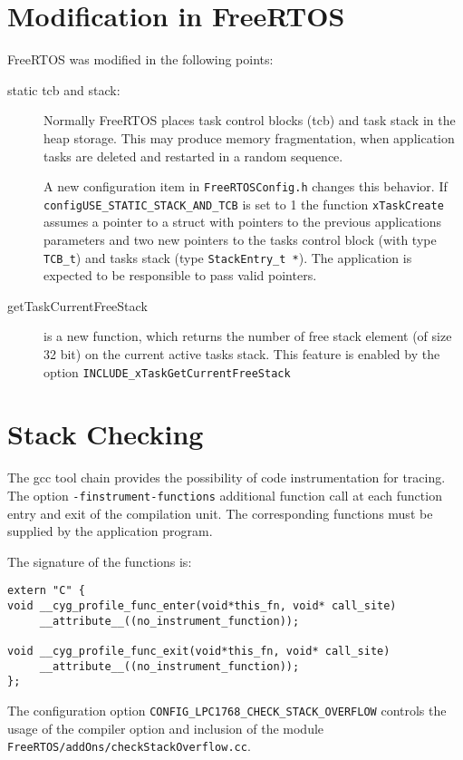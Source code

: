 \section{Modification in FreeRTOS}
FreeRTOS was modified in the following points:
\begin{description}
\item[static tcb and stack:]  Normally FreeRTOS places task control blocks (tcb)
   and task stack in the heap storage. This may produce memory fragmentation,
   when application tasks are deleted and restarted in a random sequence.

   A new configuration item in \texttt{FreeRTOSConfig.h}  changes this
   behavior. If \texttt{configUSE\_STATIC\_STACK\_AND\_TCB} is set to 1
   the function \texttt{xTaskCreate} assumes a pointer to a struct with
   pointers to the previous applications parameters and two new pointers
   to the tasks control block (with type \texttt{TCB\_t}) and tasks stack
   (type \texttt{StackEntry\_t *}). The application is expected to be
   responsible to pass valid pointers.
\item[getTaskCurrentFreeStack] is a new function, which returns the number
   of free stack element (of size 32 bit) on the current active tasks stack.
   This feature is enabled by the option
    \texttt{INCLUDE\_xTaskGetCurrentFreeStack}
\end{description}

\section{Stack Checking}
The gcc tool chain provides the possibility of code instrumentation
for tracing. The option \texttt{-finstrument-functions} additional
function call at each function entry and exit of the compilation unit.
The corresponding functions must be supplied by the application program.

The signature of the functions is:
\begin{verbatim}
extern "C" {
void __cyg_profile_func_enter(void*this_fn, void* call_site)
     __attribute__((no_instrument_function));

void __cyg_profile_func_exit(void*this_fn, void* call_site)
     __attribute__((no_instrument_function));
};
\end{verbatim}

The configuration option \texttt{CONFIG\_LPC1768\_CHECK\_STACK\_OVERFLOW}
controls the usage of the compiler option and inclusion of the
module \texttt{FreeRTOS/addOns/checkStackOverflow.cc}.


